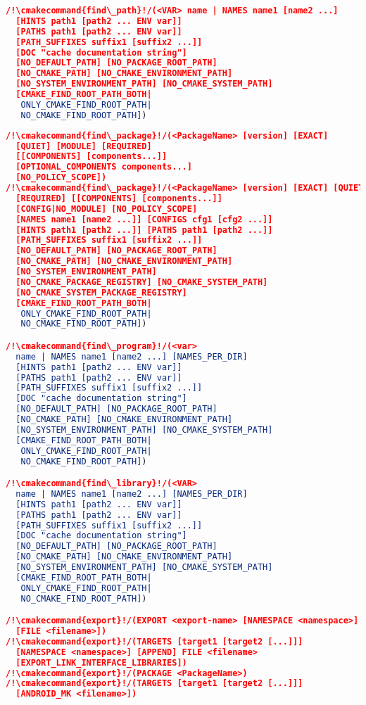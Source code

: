 \documentclass{article}
\newcommand{\cmakecommand}[1]{{\href{https://cmake.org/cmake/help/v3.13/command/#1.html}{#1}}}
\begin{document}
\begin{minipage}[t]{0.18\linewidth}
\begin{lstlisting}[language=CMake]
/!\cmakecommand{find\_path}!/(<VAR> name | NAMES name1 [name2 ...]
  [HINTS path1 [path2 ... ENV var]]
  [PATHS path1 [path2 ... ENV var]]
  [PATH_SUFFIXES suffix1 [suffix2 ...]]
  [DOC "cache documentation string"]
  [NO_DEFAULT_PATH] [NO_PACKAGE_ROOT_PATH]
  [NO_CMAKE_PATH] [NO_CMAKE_ENVIRONMENT_PATH]
  [NO_SYSTEM_ENVIRONMENT_PATH] [NO_CMAKE_SYSTEM_PATH]
  [CMAKE_FIND_ROOT_PATH_BOTH|
   ONLY_CMAKE_FIND_ROOT_PATH|
   NO_CMAKE_FIND_ROOT_PATH])
\end{lstlisting}
\end{minipage}
\hfill\vline\hfill
\begin{minipage}[t]{0.18\linewidth}
\begin{lstlisting}[language=CMake]
/!\cmakecommand{find\_package}!/(<PackageName> [version] [EXACT]
  [QUIET] [MODULE] [REQUIRED]
  [[COMPONENTS] [components...]]
  [OPTIONAL_COMPONENTS components...]
  [NO_POLICY_SCOPE])
/!\cmakecommand{find\_package}!/(<PackageName> [version] [EXACT] [QUIET]
  [REQUIRED] [[COMPONENTS] [components...]]
  [CONFIG|NO_MODULE] [NO_POLICY_SCOPE]
  [NAMES name1 [name2 ...]] [CONFIGS cfg1 [cfg2 ...]]
  [HINTS path1 [path2 ...]] [PATHS path1 [path2 ...]]
  [PATH_SUFFIXES suffix1 [suffix2 ...]]
  [NO_DEFAULT_PATH] [NO_PACKAGE_ROOT_PATH]
  [NO_CMAKE_PATH] [NO_CMAKE_ENVIRONMENT_PATH]
  [NO_SYSTEM_ENVIRONMENT_PATH]
  [NO_CMAKE_PACKAGE_REGISTRY] [NO_CMAKE_SYSTEM_PATH]
  [NO_CMAKE_SYSTEM_PACKAGE_REGISTRY]
  [CMAKE_FIND_ROOT_PATH_BOTH|
   ONLY_CMAKE_FIND_ROOT_PATH|
   NO_CMAKE_FIND_ROOT_PATH])

/!\cmakecommand{find\_program}!/(<var>
  name | NAMES name1 [name2 ...] [NAMES_PER_DIR]
  [HINTS path1 [path2 ... ENV var]]
  [PATHS path1 [path2 ... ENV var]]
  [PATH_SUFFIXES suffix1 [suffix2 ...]]
  [DOC "cache documentation string"]
  [NO_DEFAULT_PATH] [NO_PACKAGE_ROOT_PATH]
  [NO_CMAKE_PATH] [NO_CMAKE_ENVIRONMENT_PATH]
  [NO_SYSTEM_ENVIRONMENT_PATH] [NO_CMAKE_SYSTEM_PATH]
  [CMAKE_FIND_ROOT_PATH_BOTH|
   ONLY_CMAKE_FIND_ROOT_PATH|
   NO_CMAKE_FIND_ROOT_PATH])

/!\cmakecommand{find\_library}!/(<VAR>
  name | NAMES name1 [name2 ...] [NAMES_PER_DIR]
  [HINTS path1 [path2 ... ENV var]]
  [PATHS path1 [path2 ... ENV var]]
  [PATH_SUFFIXES suffix1 [suffix2 ...]]
  [DOC "cache documentation string"]
  [NO_DEFAULT_PATH] [NO_PACKAGE_ROOT_PATH]
  [NO_CMAKE_PATH] [NO_CMAKE_ENVIRONMENT_PATH]
  [NO_SYSTEM_ENVIRONMENT_PATH] [NO_CMAKE_SYSTEM_PATH]
  [CMAKE_FIND_ROOT_PATH_BOTH|
   ONLY_CMAKE_FIND_ROOT_PATH|
   NO_CMAKE_FIND_ROOT_PATH])

/!\cmakecommand{export}!/(EXPORT <export-name> [NAMESPACE <namespace>]
  [FILE <filename>])
/!\cmakecommand{export}!/(TARGETS [target1 [target2 [...]]]
  [NAMESPACE <namespace>] [APPEND] FILE <filename>
  [EXPORT_LINK_INTERFACE_LIBRARIES])
/!\cmakecommand{export}!/(PACKAGE <PackageName>)
/!\cmakecommand{export}!/(TARGETS [target1 [target2 [...]]]
  [ANDROID_MK <filename>])


\end{lstlisting}
\end{minipage}
\end{document}
